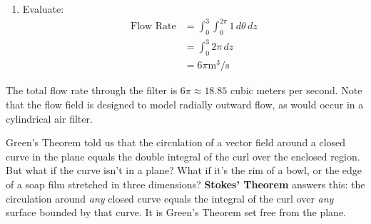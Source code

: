 \begin{example}
\begin{solution}
\begin{enumerate}
    \item Evaluate:
    \begin{align*}
        \text{Flow Rate} &= \int_0^3\int_0^{2\pi} 1\,d\theta\,dz \\
        &= \int_0^3 2\pi\,dz \\
        &= 6\pi \text{m}^3/\text{s}
    \end{align*}
\end{enumerate}

\noindent The total flow rate through the filter is $6\pi \approx 18.85$ cubic meters per second. Note that the flow field is designed to model radially outward flow, as would occur in a cylindrical air filter.

\end{solution}
\end{example}
\exampleline


\newpage

 

\noindent
Green's Theorem told us that the circulation of a vector field around a closed curve in the plane equals the double integral of the curl over the enclosed region. But what if the curve isn't in a plane? What if it's the rim of a bowl, or the edge of a soap film stretched in three dimensions? \textbf{Stokes' Theorem} answers this: the circulation around \textit{any} closed curve equals the integral of the curl over \textit{any} surface bounded by that curve. It is Green's Theorem set free from the plane.

